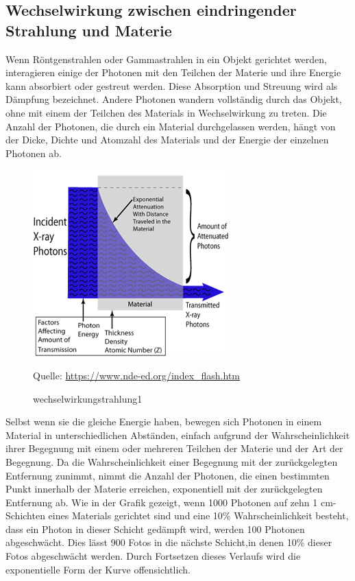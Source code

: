 {{\subsection{Wechselwirkung zwischen eindringender Strahlung
und Materie}
Wenn Röntgenstrahlen oder Gammastrahlen in ein Objekt gerichtet werden, interagieren einige der Photonen mit den Teilchen der Materie und ihre Energie kann absorbiert oder gestreut werden. Diese Absorption und Streuung wird als Dämpfung bezeichnet. Andere Photonen wandern vollständig durch das Objekt, ohne mit einem der Teilchen des Materials in Wechselwirkung zu treten. Die Anzahl der Photonen, die durch ein Material durchgelassen werden, hängt von der Dicke, Dichte und Atomzahl des Materials und der Energie der einzelnen Photonen ab.
\begin{figure}[htb]
  \centering  
  \includegraphics[scale=0.6]{img/wechselwirkungstrahlung1.png}
  \caption{wechselwirkungstrahlung1}
  Quelle: \url{https://www.nde-ed.org/index_flash.htm}
  \label{fig:strahlung1}
\end{figure}
Selbst wenn sie die gleiche Energie haben, bewegen sich Photonen in einem Material in unterschiedlichen Abständen, einfach aufgrund der Wahrscheinlichkeit ihrer Begegnung mit einem oder mehreren Teilchen der Materie und der Art der Begegnung.
Da die Wahrscheinlichkeit einer Begegnung mit der zurückgelegten Entfernung zunimmt, nimmt die Anzahl der Photonen, die einen bestimmten Punkt innerhalb der Materie erreichen, exponentiell mit der zurückgelegten Entfernung ab.
Wie in der Grafik gezeigt, wenn 1000 Photonen auf zehn 1 cm-Schichten eines Materials gerichtet sind und eine 10\% Wahrscheinlichkeit besteht, dass ein Photon in dieser Schicht gedämpft wird, werden 100 Photonen abgeschwächt. Dies lässt 900 Fotos in die nächste Schicht,in denen 10\% dieser Fotos abgeschwächt werden.
Durch Fortsetzen dieses Verlaufs wird die exponentielle Form der Kurve offensichtlich.
}}
